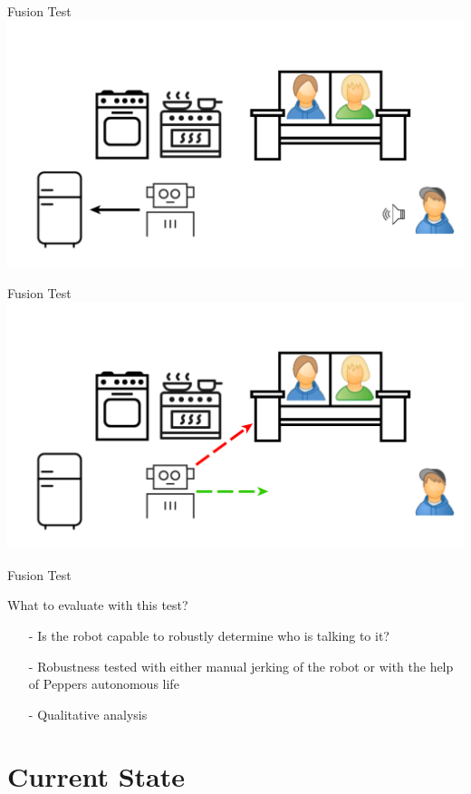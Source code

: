 \documentclass{beamer}
\begin{document}
	\begin{frame}{Fusion Test}
		\centering
		\includegraphics[width=.75\textwidth]{Bilder/fusion_test_1}
	\end{frame}
	
	\begin{frame}{Fusion Test}
		\centering
		\includegraphics[width=.75\textwidth]{Bilder/fusion_test_2}
	\end{frame}
	
	\begin{frame}{Fusion Test}
		\begin{alertblock}{What to evaluate with this test?}
			\pause
			\begin{itemize}
				\item[-] Is the robot capable to robustly determine who is talking to it?
				\item[-] Robustness tested with either manual jerking of the robot or with the help of Peppers autonomous life
				\item[-] Qualitative analysis 
			\end{itemize}
		\end{alertblock}
	\end{frame}
	
	
	
	
	
	
	
	\section{Current State}
	
\end{document}
